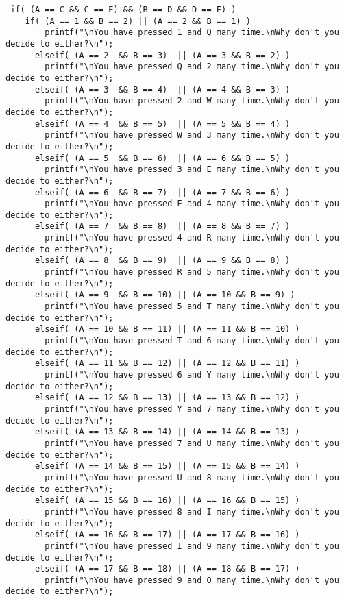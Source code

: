 {\begin{verbatim}
 if( (A == C && C == E) && (B == D && D == F) )
    if( (A == 1 && B == 2) || (A == 2 && B == 1) )
        printf("\nYou have pressed 1 and Q many time.\nWhy don't you decide to either?\n");
      elseif( (A == 2  && B == 3)  || (A == 3 && B == 2) )
        printf("\nYou have pressed Q and 2 many time.\nWhy don't you decide to either?\n");
      elseif( (A == 3  && B == 4)  || (A == 4 && B == 3) )
        printf("\nYou have pressed 2 and W many time.\nWhy don't you decide to either?\n");
      elseif( (A == 4  && B == 5)  || (A == 5 && B == 4) )
        printf("\nYou have pressed W and 3 many time.\nWhy don't you decide to either?\n");
      elseif( (A == 5  && B == 6)  || (A == 6 && B == 5) )
        printf("\nYou have pressed 3 and E many time.\nWhy don't you decide to either?\n");
      elseif( (A == 6  && B == 7)  || (A == 7 && B == 6) )
        printf("\nYou have pressed E and 4 many time.\nWhy don't you decide to either?\n");
      elseif( (A == 7  && B == 8)  || (A == 8 && B == 7) )
        printf("\nYou have pressed 4 and R many time.\nWhy don't you decide to either?\n");
      elseif( (A == 8  && B == 9)  || (A == 9 && B == 8) )
        printf("\nYou have pressed R and 5 many time.\nWhy don't you decide to either?\n");
      elseif( (A == 9  && B == 10) || (A == 10 && B == 9) )
        printf("\nYou have pressed 5 and T many time.\nWhy don't you decide to either?\n");
      elseif( (A == 10 && B == 11) || (A == 11 && B == 10) )
        printf("\nYou have pressed T and 6 many time.\nWhy don't you decide to either?\n");
      elseif( (A == 11 && B == 12) || (A == 12 && B == 11) )
        printf("\nYou have pressed 6 and Y many time.\nWhy don't you decide to either?\n");
      elseif( (A == 12 && B == 13) || (A == 13 && B == 12) )
        printf("\nYou have pressed Y and 7 many time.\nWhy don't you decide to either?\n");
      elseif( (A == 13 && B == 14) || (A == 14 && B == 13) )
        printf("\nYou have pressed 7 and U many time.\nWhy don't you decide to either?\n");
      elseif( (A == 14 && B == 15) || (A == 15 && B == 14) )
        printf("\nYou have pressed U and 8 many time.\nWhy don't you decide to either?\n");
      elseif( (A == 15 && B == 16) || (A == 16 && B == 15) )
        printf("\nYou have pressed 8 and I many time.\nWhy don't you decide to either?\n");
      elseif( (A == 16 && B == 17) || (A == 17 && B == 16) )
        printf("\nYou have pressed I and 9 many time.\nWhy don't you decide to either?\n");
      elseif( (A == 17 && B == 18) || (A == 18 && B == 17) )
        printf("\nYou have pressed 9 and O many time.\nWhy don't you decide to either?\n");

\end{verbatim}}
